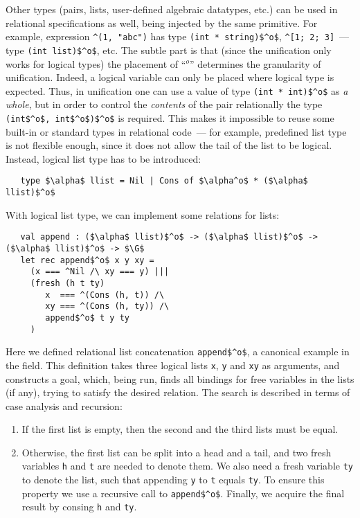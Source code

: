 Other types (pairs, lists, user-defined algebraic datatypes, etc.) can be used in relational specifications as well, being injected by the same primitive. For example, expression \lstinline{^(1, "abc")} has type \lstinline{(int * string)$^o$}, \lstinline{^[1; 2; 3]}~--- type \lstinline{(int list)$^o$}, etc. The subtle part is that (since the unification only works for logical types) the placement of ``$^o$'' determines the granularity of unification. Indeed, a logical variable can only be placed where logical type is expected. Thus, in unification one can use a value of type \lstinline{(int * int)$^o$} as \emph{a whole}, but in order to control the \emph{contents} of the pair relationally the type \lstinline{(int$^o$, int$^o$)$^o$} is required. This makes it impossible to reuse some built-in or standard types in relational code~--- for example, predefined list type is not flexible enough, since it does not allow the tail of the list to be logical. Instead, logical list type has to be introduced:

\begin{lstlisting}
   type $\alpha$ llist = Nil | Cons of $\alpha^o$ * ($\alpha$ llist)$^o$
\end{lstlisting}

With logical list type, we can implement some relations for lists:

\begin{lstlisting}
   val append : ($\alpha$ llist)$^o$ -> ($\alpha$ llist)$^o$ -> ($\alpha$ llist)$^o$ -> $\G$
   let rec append$^o$ x y xy =
     (x === ^Nil /\ xy === y) |||
     (fresh (h t ty)
        x  === ^(Cons (h, t)) /\
        xy === ^(Cons (h, ty)) /\
        append$^o$ t y ty
     ) 
\end{lstlisting}

Here we defined relational list concatenation \lstinline{append$^o$}, a canonical example in the field. This definition takes three logical lists \lstinline{x}, \lstinline{y} and \lstinline{xy} as arguments, and constructs a goal, which, being run, finds all bindings for free variables in the lists (if any), trying to satisfy the desired relation. The search is described in terms of case analysis and recursion:

\begin{enumerate}
\item If the first list is empty, then the second and the third lists must be equal.
\item Otherwise, the first list can be split into a head and a tail, and two fresh variables \lstinline{h} and \lstinline{t} are needed to denote them. We also need a fresh variable \lstinline{ty} to denote the list, such that appending \lstinline{y} to \lstinline{t} equals \lstinline{ty}. To ensure this property we use a recursive call to \lstinline{append$^o$}. Finally, we acquire the final result by consing \lstinline{h} and \lstinline{ty}. 
\end{enumerate}

